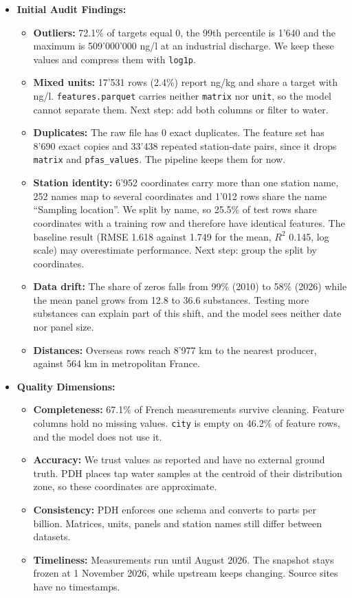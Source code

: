 \documentclass[11pt, a4paper]{article}
\newcommand{\code}[1]{\texttt{#1}}
\begin{document}
\begin{itemize}
    \item \textbf{Initial Audit Findings:}
    \begin{itemize}
        \item \textbf{Outliers:} 72.1\% of targets equal 0, the 99th percentile is 1'640 and the maximum is 509'000'000 ng/l at an industrial discharge. We keep these values and compress them with \code{log1p}.
        \item \textbf{Mixed units:} 17'531 rows (2.4\%) report ng/kg and share a target with ng/l. \code{features.parquet} carries neither \code{matrix} nor \code{unit}, so the model cannot separate them. Next step: add both columns or filter to water.
        \item \textbf{Duplicates:} The raw file has 0 exact duplicates. The feature set has 8'690 exact copies and 33'438 repeated station-date pairs, since it drops \code{matrix} and \code{pfas\_values}. The pipeline keeps them for now.
        \item \textbf{Station identity:} 6'952 coordinates carry more than one station name, 252 names map to several coordinates and 1'012 rows share the name ``Sampling location''. We split by name, so 25.5\% of test rows share coordinates with a training row and therefore have identical features. The baseline result (RMSE 1.618 against 1.749 for the mean, $R^2$ 0.145, log scale) may overestimate performance. Next step: group the split by coordinates.
        \item \textbf{Data drift:} The share of zeros falls from 99\% (2010) to 58\% (2026) while the mean panel grows from 12.8 to 36.6 substances. Testing more substances can explain part of this shift, and the model sees neither date nor panel size.
        \item \textbf{Distances:} Overseas rows reach 8'977 km to the nearest producer, against 564 km in metropolitan France.
    \end{itemize}
    \item \textbf{Quality Dimensions:}
    \begin{itemize}
        \item \textbf{Completeness:} 67.1\% of French measurements survive cleaning. Feature columns hold no missing values. \code{city} is empty on 46.2\% of feature rows, and the model does not use it.
        \item \textbf{Accuracy:} We trust values as reported and have no external ground truth. PDH places tap water samples at the centroid of their distribution zone, so these coordinates are approximate.
        \item \textbf{Consistency:} PDH enforces one schema and converts to parts per billion. Matrices, units, panels and station names still differ between datasets.
        \item \textbf{Timeliness:} Measurements run until August 2026. The snapshot stays frozen at 1 November 2026, while upstream keeps changing. Source sites have no timestamps.
    \end{itemize}
\end{itemize}
\end{document}
